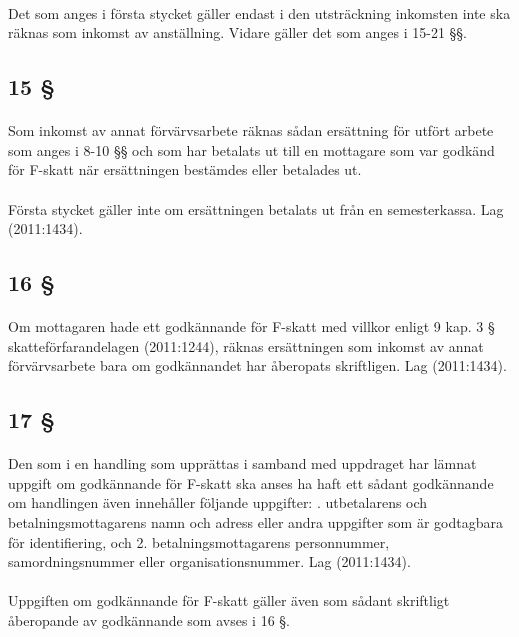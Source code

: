 \documentclass[a4paper,notitlepage,openany,10pt]{book}
\begin{document}
\paragraph*{}
Det som anges i första stycket gäller endast i den utsträckning inkomsten inte ska räknas som inkomst av anställning. Vidare gäller det som anges i 15-21 §§.
\subsection*{15 §}
\paragraph*{}
Som inkomst av annat förvärvsarbete räknas sådan ersättning för utfört arbete som anges i 8-10 §§ och som har betalats ut till en mottagare som var godkänd för F-skatt när ersättningen bestämdes eller betalades ut.
\paragraph*{}
Första stycket gäller inte om ersättningen betalats ut från en semesterkassa.
Lag (2011:1434).
\subsection*{16 §}
\paragraph*{}
Om mottagaren hade ett godkännande för F-skatt med villkor enligt 9 kap. 3 § skatteförfarandelagen (2011:1244), räknas ersättningen som inkomst av annat förvärvsarbete bara om godkännandet har åberopats skriftligen.
Lag (2011:1434).
\subsection*{17 §}
\paragraph*{}
Den som i en handling som upprättas i samband med uppdraget har lämnat uppgift om godkännande för F-skatt ska anses ha haft ett sådant godkännande om handlingen även innehåller följande uppgifter:
. utbetalarens och betalningsmottagarens namn och adress eller andra uppgifter som är godtagbara för identifiering, och 2. betalningsmottagarens personnummer, samordningsnummer eller organisationsnummer.
Lag (2011:1434).
\paragraph*{}
Uppgiften om godkännande för F-skatt gäller även som sådant skriftligt åberopande av godkännande som avses i 16 §.
\end{document}

